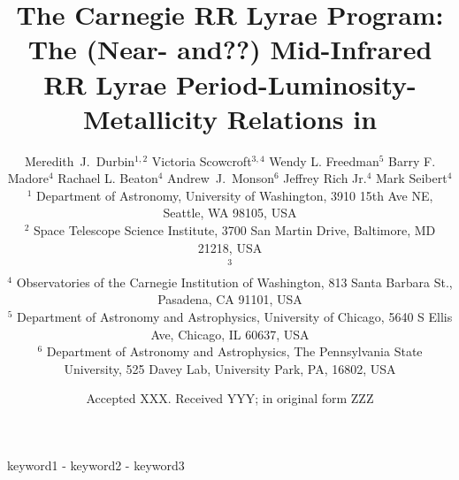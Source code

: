 \documentclass[a4paper,fleqn,usenatbib]{mnras}
\title[Mid-IR RRL PLZ Relations in $\omega$ Cen]{The Carnegie RR Lyrae Program: The (Near- and??) Mid-Infrared RR Lyrae Period-Luminosity-Metallicity Relations in \ocen}
\author[M.~J.~Durbin et al.]{Meredith~J.~Durbin$^{1,2}$
Victoria Scowcroft$^{3,4}$
Wendy L. Freedman$^{5}$
Barry F. Madore$^{4}$
\newauthor Rachael L. Beaton$^{4}$
Andrew~J.~Monson$^{6}$
Jeffrey Rich Jr.$^{4}$
Mark Seibert$^{4}$
\\
$^1$ Department of Astronomy, University of Washington, 3910 15th Ave NE, Seattle, WA 98105, USA \\
$^2$ Space Telescope Science Institute, 3700 San Martin Drive, Baltimore, MD 21218, USA \\
$^3$ \mjdcomment{I cannot find the address of the Bath astro department} \\
$^4$ Observatories of the Carnegie Institution of Washington, 813 Santa Barbara St., Pasadena, CA 91101, USA \\
$^5$ Department of Astronomy and Astrophysics, University of Chicago, 5640 S Ellis Ave, Chicago, IL 60637, USA \\
$^{6}$ Department of Astronomy and Astrophysics, The Pennsylvania State University, 525 Davey Lab, University Park, PA, 16802, USA \\
}
\date{Accepted XXX. Received YYY; in original form ZZZ}
\providecommand{\mjdcomment}[1]{{\textcolor{red}{{MJD: #1}}}\xspace}
\begin{document}
\label{firstpage}
\pagerange{\pageref{firstpage}-\pageref{lastpage}}
\maketitle

\begin{abstract}
\end{abstract}

\begin{keywords}
keyword1 - keyword2 - keyword3
\end{keywords}









\end{document}
